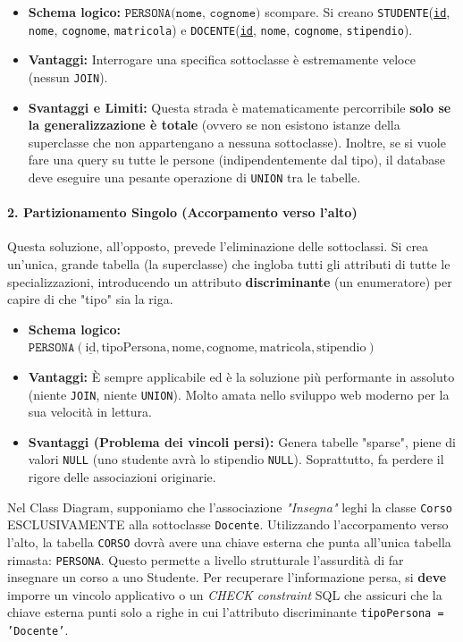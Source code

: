 \begin{itemize}
    \item \textbf{Schema logico:} $\texttt{PERSONA(nome, cognome)}$ scompare. Si creano \texttt{STUDENTE}(\underline{\texttt{id}}, \texttt{nome}, \texttt{cognome}, \texttt{matricola}) e \texttt{DOCENTE}(\underline{\texttt{id}}, \texttt{nome}, \texttt{cognome}, \texttt{stipendio}).
    \item \textbf{Vantaggi:} Interrogare una specifica sottoclasse è estremamente veloce (nessun \texttt{JOIN}).
    \item \textbf{Svantaggi e Limiti:} Questa strada è matematicamente percorribile \textbf{solo se la generalizzazione è totale} (ovvero se non esistono istanze della superclasse che non appartengano a nessuna sottoclasse). Inoltre, se si vuole fare una query su tutte le persone (indipendentemente dal tipo), il database deve eseguire una pesante operazione di \texttt{UNION} tra le tabelle.
\end{itemize}

\paragraph{2. Partizionamento Singolo (Accorpamento verso l'alto)}
Questa soluzione, all'opposto, prevede l'eliminazione delle sottoclassi. Si crea un'unica, grande tabella (la superclasse) che ingloba tutti gli attributi di tutte le specializzazioni, introducendo un attributo \textbf{discriminante} (un enumeratore) per capire di che "tipo" sia la riga.

\begin{itemize}
    \item \textbf{Schema logico:} $\texttt{PERSONA}(\underline{\text{id}}, \text{tipoPersona}, \text{nome}, \text{cognome}, \text{matricola}, \text{stipendio})$
    \item \textbf{Vantaggi:} È sempre applicabile ed è la soluzione più performante in assoluto (niente \texttt{JOIN}, niente \texttt{UNION}). Molto amata nello sviluppo web moderno per la sua velocità in lettura.
    \item \textbf{Svantaggi (Problema dei vincoli persi):} Genera tabelle "sparse", piene di valori \texttt{NULL} (uno studente avrà lo stipendio \texttt{NULL}). Soprattutto, fa perdere il rigore delle associazioni originarie. 
\end{itemize}

\begin{example}
Nel Class Diagram, supponiamo che l'associazione \textit{"Insegna"} leghi la classe \texttt{Corso} ESCLUSIVAMENTE alla sottoclasse \texttt{Docente}. 
Utilizzando l'accorpamento verso l'alto, la tabella \texttt{CORSO} dovrà avere una chiave esterna che punta all'unica tabella rimasta: \texttt{PERSONA}.
Questo permette a livello strutturale l'assurdità di far insegnare un corso a uno Studente. Per recuperare l'informazione persa, si \textbf{deve} imporre un vincolo applicativo o un \textit{CHECK constraint} SQL che assicuri che la chiave esterna punti solo a righe in cui l'attributo discriminante \texttt{tipoPersona = 'Docente'}.
\end{example}

